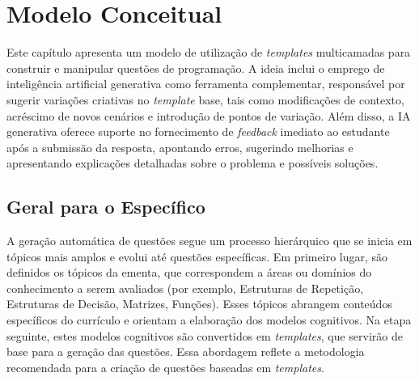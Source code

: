 \chapter{Modelo Conceitual}

Este capítulo apresenta um modelo de utilização de \textit{templates} multicamadas para construir e manipular questões de programação. A ideia inclui o emprego de inteligência artificial generativa como ferramenta complementar, responsável por sugerir variações criativas no \textit{template} base, tais como modificações de contexto, acréscimo de novos cenários e introdução de pontos de variação. Além disso, a IA generativa oferece suporte no fornecimento de \textit{feedback} imediato ao estudante após a submissão da resposta, apontando erros, sugerindo melhorias e apresentando explicações detalhadas sobre o problema e possíveis soluções. 

\section{Geral para o Específico}
A geração automática de questões segue um processo hierárquico que se inicia em tópicos mais amplos e evolui até questões específicas. Em primeiro lugar, são definidos os tópicos da ementa, que correspondem a áreas ou domínios do conhecimento a serem avaliados (por exemplo, Estruturas de Repetição, Estruturas de Decisão, Matrizes, Funções). Esses tópicos abrangem conteúdos específicos do currículo e orientam a elaboração dos modelos cognitivos. Na etapa seguinte, estes modelos cognitivos são convertidos em \textit{templates}, que servirão de base para a geração das questões. Essa abordagem reflete a metodologia recomendada para a criação de questões baseadas em \textit{templates}. 

